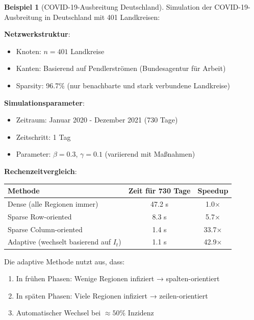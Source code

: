 \documentclass[a4paper,12pt]{report}
\theoremstyle{definition}
\newtheorem{beispiel}{Beispiel}
\begin{document}
	\begin{beispiel}[COVID-19-Ausbreitung Deutschland]
		Simulation der COVID-19-Ausbreitung in Deutschland mit 401 Landkreisen:
		
		\textbf{Netzwerkstruktur}:
		\begin{itemize}
			\item Knoten: $n = 401$ Landkreise
			\item Kanten: Basierend auf Pendlerströmen (Bundesagentur für Arbeit)
			\item Sparsity: 96.7\% (nur benachbarte und stark verbundene Landkreise)
		\end{itemize}
		
		\textbf{Simulationsparameter}:
		\begin{itemize}
			\item Zeitraum: Januar 2020 - Dezember 2021 (730 Tage)
			\item Zeitschritt: 1 Tag
			\item Parameter: $\beta = 0.3$, $\gamma = 0.1$ (variierend mit Maßnahmen)
		\end{itemize}
		
		\textbf{Rechenzeitvergleich}:
		\begin{center}
			\begin{tabular}{|l|c|c|}
				\hline
				\textbf{Methode} & \textbf{Zeit für 730 Tage} & \textbf{Speedup} \\
				\hline
				Dense (alle Regionen immer) & 47.2 s & 1.0$\times$ \\
				Sparse Row-oriented & 8.3 s & 5.7$\times$ \\
				Sparse Column-oriented & 1.4 s & 33.7$\times$ \\
				Adaptive (wechselt basierend auf $I_t$) & 1.1 s & 42.9$\times$ \\
				\hline
			\end{tabular}
		\end{center}
		
		Die adaptive Methode nutzt aus, dass:
		\begin{enumerate}
			\item In frühen Phasen: Wenige Regionen infiziert → spalten-orientiert
			\item In späten Phasen: Viele Regionen infiziert → zeilen-orientiert
			\item Automatischer Wechsel bei $\approx 50\%$ Inzidenz
		\end{enumerate}
	\end{beispiel}
	
\end{document}
